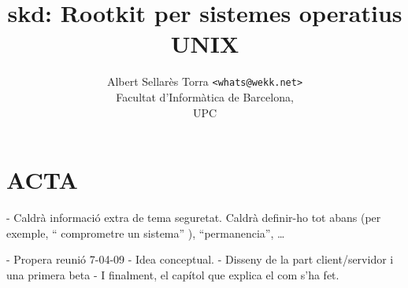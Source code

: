 \documentclass[a4paper]{report}
\author{Albert Sellarès Torra \texttt{<whats@wekk.net>}\\
		Facultat d'Informàtica de Barcelona,\\
		UPC\\}
\title{skd: Rootkit per sistemes operatius UNIX}
\begin{document}




















\appendix







\section{ACTA}

- Caldrà informació extra de tema seguretat. Caldrà definir-ho tot abans
(per exemple, `` comprometre un sistema'' ), ``permanencia'', \ldots

- Propera reunió 7-04-09
- Idea conceptual.
- Disseny de la part client/servidor i una primera beta
- I finalment, el capítol que explica el com s'ha fet.
\end{document}
